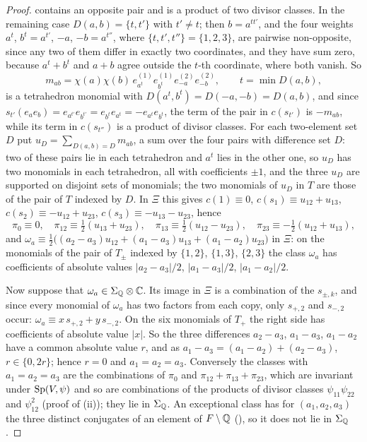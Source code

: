 \begin{proof}
contains an opposite pair and is a product of two divisor classes. In the
remaining case $D(a,b)=\{t,t'\}$ with $t'\ne t$; then $b=a^{tt'}$, and the
four weights $a^{t}$, $b^{t}=a^{t'}$, $-a$, $-b=a^{t''}$, where
$\{t,t',t''\}=\{1,2,3\}$, are pairwise non-opposite, since any two of them
differ in exactly two coordinates, and they have sum zero, because
$a^{t}+b^{t}$ and $a+b$ agree outside the $t$-th coordinate, where both
vanish. So
\[
  m_{ab}=\chi(a)\chi(b)\,e^{(1)}_{a^{t}}e^{(1)}_{b^{t}}e^{(2)}_{-a}e^{(2)}_{-b},
  \qquad t=\min D(a,b),
\]
is a tetrahedron monomial with $D(a^{t},b^{t})=D(-a,-b)=D(a,b)$, and since
$s_{t'}(e_{a}e_{b})=e_{a^{t'}}e_{b^{t'}}=e_{b^{t}}e_{a^{t}}=-e_{a^{t}}e_{b^{t}}$,
the term of the pair in $c(s_{t'})$ is $-m_{ab}$, while its term in
$c(s_{t''})$ is a product of divisor classes. For each two-element set $D$
put $u_{D}=\sum_{D(a,b)=D}m_{ab}$, a sum over the four pairs with difference
set $D$: two of these pairs lie in each tetrahedron and $a^{t}$ lies in the
other one, so $u_{D}$ has two monomials in each tetrahedron, all with
coefficients $\pm1$, and the three $u_{D}$ are supported on disjoint sets of
monomials; the two monomials of $u_{D}$ in $T$ are those of the pair of
$T$ indexed by $D$. In $\Xi$ this gives $c(1)\equiv0$,
$c(s_{1})\equiv u_{12}+u_{13}$, $c(s_{2})\equiv-u_{12}+u_{23}$,
$c(s_{3})\equiv-u_{13}-u_{23}$, hence
\begin{equation}\label{eq:pimodulo}
  \pi_{0}\equiv0,\quad
  \pi_{12}\equiv\tfrac12(u_{13}+u_{23}),\quad
  \pi_{13}\equiv\tfrac12(u_{12}-u_{23}),\quad
  \pi_{23}\equiv-\tfrac12(u_{12}+u_{13}),
\end{equation}
and $\omega_{a}\equiv\frac12\bigl((a_{2}-a_{3})u_{12}+(a_{1}-a_{3})u_{13}
+(a_{1}-a_{2})u_{23}\bigr)$ in $\Xi$: on the monomials of the pair of
$T_{\pm}$ indexed by $\{1,2\}$, $\{1,3\}$, $\{2,3\}$ the class $\omega_{a}$
has coefficients of absolute values $|a_{2}-a_{3}|/2$, $|a_{1}-a_{3}|/2$,
$|a_{1}-a_{2}|/2$.

Now suppose that $\omega_{a}\in\Sigma_{\mathbb{Q}}\otimes\mathbb{C}$. Its image in $\Xi$
is a combination of the $s_{\pm,k}$, and since every monomial of
$\omega_{a}$ has two factors from each copy, only $s_{+,2}$ and $s_{-,2}$
occur: $\omega_{a}\equiv x\,s_{+,2}+y\,s_{-,2}$. On the six monomials of
$T_{+}$ the right side has coefficients of absolute value $|x|$. So the
three differences $a_{2}-a_{3}$, $a_{1}-a_{3}$, $a_{1}-a_{2}$ have a common
absolute value $r$, and as $a_{1}-a_{3}=(a_{1}-a_{2})+(a_{2}-a_{3})$,
$r\in\{0,2r\}$; hence $r=0$ and $a_{1}=a_{2}=a_{3}$. Conversely the classes
with $a_{1}=a_{2}=a_{3}$ are the combinations of $\pi_{0}$ and
$\pi_{12}+\pi_{13}+\pi_{23}$, which are invariant under $\operatorname{Sp}(V,\psi)$ and so
are combinations of the products of divisor classes $\psi_{11}\psi_{22}$ and
$\psi_{12}^{2}$ (proof of (ii)); they lie in
$\Sigma_{\mathbb{Q}}$. An exceptional class
has for $(a_{1},a_{2},a_{3})$ the three distinct conjugates of an element of
$F\setminus\mathbb{Q}$ (), so it does not lie in
$\Sigma_{\mathbb{Q}}$.


\end{proof}
